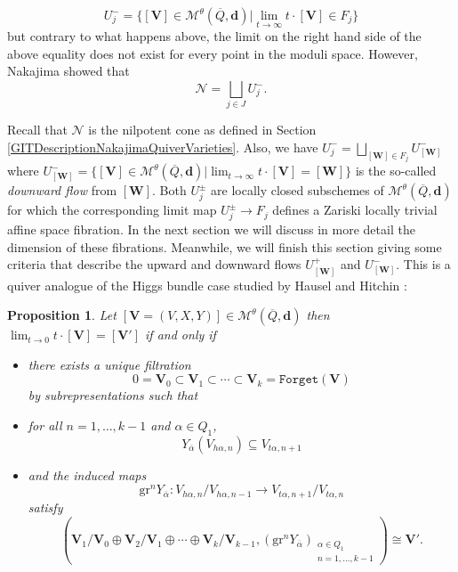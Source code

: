 \documentclass{amsart}
\theoremstyle{plain}
\newtheorem{proposition}[theorem]{Proposition}
\numberwithin{equation}{section}
\theoremstyle{definition}
\theoremstyle{remark}
\begin{document}
	$$
	U_j^-=\{[\mathbf{V}]\in \mathcal{M}^{\theta}(\overline{Q},\mathbf{d})| \lim_{t\to \infty}t\cdot[\mathbf{V}]\in F_j\}
	$$
	but contrary to what happens above, the limit on the right hand side of the above equality does not exist for every point in the moduli space. However, Nakajima \cite[Theorem 5.8]{Nakajima} showed that 
	\begin{equation}\label{decompositionNilpotentCone}
	\mathcal{N}=\bigsqcup_{j\in J}U_j^-.
	\end{equation}

	Recall that $\mathcal{N}$ is the nilpotent cone as defined in Section \ref{GITDescriptionNakajimaQuiverVarieties}. 
	Also, we have $U_j^-=\bigsqcup_{[\mathbf{W}]\in F_j}U_{[\mathbf{W}]}^-$ where $U_{[\mathbf{W}]}^-=\{[\mathbf{V}]\in\mathcal{M}^{\theta}(\overline{Q},\mathbf{d}) |  \lim_{t\to \infty}t\cdot [\mathbf{V}]=[\mathbf{W}]\}$ is the so-called \emph{downward flow} from $[\mathbf{W}]$.  Both  $U_j^\pm$ are locally closed subschemes of $\mathcal{M}^{\theta}(\overline{Q},\mathbf{d})$ for which the corresponding limit map $U_j^\pm\to F_j$ defines a Zariski locally trivial affine space fibration. In the next section we will discuss in more detail the dimension of these fibrations. Meanwhile, we will finish this section giving some criteria that describe the upward and downward flows $U_{[\mathbf{W}]}^+$ and $U_{[\mathbf{W}]}^-$. This is a quiver analogue of the Higgs bundle case studied by Hausel and Hitchin \cite[Proposition 3.4 and Proposition 3.11]{HauselHitchin}:
	\begin{proposition}\label{reesConstructionLimitToZero}
		Let $[\mathbf{V}=(V,X,Y)]\in \mathcal{M}^{\theta}(\overline{Q},\mathbf{d})$ then $\lim_{t\to 0}t\cdot[\mathbf{V}]=[\mathbf{V}']$ if and only if 
		\begin{itemize}
			\item there exists a unique filtration 
			{\normalfont
				$$
				0=\mathbf{V}_0\subset \mathbf{V}_1\subset\cdots\subset \mathbf{V}_k=\texttt{Forget}(\mathbf{V})
				$$}
			by subrepresentations such that 
			\item for all $n=1,\ldots,k-1$ and $\alpha\in Q_1$, $$Y_{\overline{\alpha}}(V_{h\alpha,n})\subseteq V_{t\alpha,n+1}$$
			\item and the induced maps 
			{\normalfont$$
				\text{gr}^{n}Y_{\overline{\alpha}}:V_{h\alpha,n}/V_{h\alpha,n-1}\to V_{t\alpha,n+1}/V_{t\alpha,n}
				$$}
			satisfy 
			{\normalfont
				$$
				(\mathbf{V}_1/\mathbf{V}_0\oplus \mathbf{V}_2/\mathbf{V}_1\oplus\cdots \oplus \mathbf{V}_k/\mathbf{V}_{k-1},(\text{gr}^nY_{\overline{\alpha}})_{\substack{\alpha\in Q_1\\ n=1,\ldots,k-1}})\cong \mathbf{V}'.
				$$}
		\end{itemize}
		
	\end{proposition}
\end{document}
